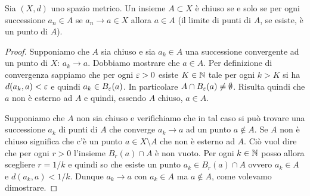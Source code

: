 \begin{theorem}%
  \label{th:chiuso_sequenziale}%
Sia $(X,d)$ uno spazio metrico.
Un insieme $A\subset X$ è chiuso se e solo se
per ogni successione $a_n\in A$ se $a_n\to a\in X$ allora $a \in A$
(il limite di punti di $A$, se esiste, è un punto di $A$).
\end{theorem}
%
\begin{proof}
Supponiamo che $A$ sia chiuso e sia
$a_k \in A$ una successione convergente ad un punto di $X$: $a_k \to a$.
Dobbiamo mostrare che $a\in A$.
Per definizione di convergenza
sappiamo che per ogni $\varepsilon>0$ esiste $K\in {\mathbb N}$ tale per ogni $k> K$
si ha $d(a_k,a)<\varepsilon$ e quindi $a_k \in B_\varepsilon(a)$.
In particolare $A \cap B_\varepsilon(a) \neq \emptyset$.
Risulta quindi che $a$ non è esterno ad $A$ e quindi, essendo $A$ chiuso, $a\in A$.

Supponiamo che $A$ non sia chiuso e verifichiamo che in tal caso
si può trovare una successione $a_k$ di punti di $A$ che converge $a_k\to a$
ad un punto $a\not\in A$.
Se $A$ non è chiuso significa che c'è un punto $a \in X\setminus A$ che non è esterno ad $A$.
Ciò vuol dire che per ogni $r>0$ l'insieme $B_r(a)\cap A$ è non vuoto. Per ogni $k\in {\mathbb N}$ posso allora
scegliere $r=1/k$ e quindi so che esiste un punto $a_k\in B_r(a) \cap A$ ovvero $a_k \in A$ e
$d(a_k,a) < 1/k$.
Dunque $a_k \to a$ con $a_k\in A$ ma $a\not \in A$, come volevamo dimostrare.
\end{proof}

